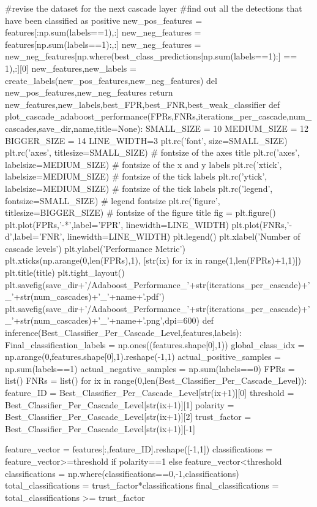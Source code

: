 \documentclass{article}
\begin{document}
\begin{python}
	#revise the dataset for the next cascade layer
	#find out all the detections that have been classified as positive
	new_pos_features = features[:np.sum(labels==1),:]
	new_neg_features = features[np.sum(labels==1):,:]
	new_neg_features = new_neg_features[np.where(best_class_predictions[np.sum(labels==1):] == 1),:][0]
	new_features,new_labels = create_labels(new_pos_features,new_neg_features)
	del new_pos_features,new_neg_features
	return new_features,new_labels,best_FPR,best_FNR,best_weak_classifier
def plot_cascade_adaboost_performance(FPRs,FNRs,iterations_per_cascade,num_cascades,save_dir,name,title=None):
	SMALL_SIZE = 10
	MEDIUM_SIZE = 12
	BIGGER_SIZE = 14
	LINE_WIDTH=3
	plt.rc('font', size=SMALL_SIZE)
	plt.rc('axes', titlesize=SMALL_SIZE)     # fontsize of the axes title
	plt.rc('axes', labelsize=MEDIUM_SIZE)    # fontsize of the x and y labels
	plt.rc('xtick', labelsize=MEDIUM_SIZE)    # fontsize of the tick labels
	plt.rc('ytick', labelsize=MEDIUM_SIZE)    # fontsize of the tick labels
	plt.rc('legend', fontsize=SMALL_SIZE)    # legend fontsize
	plt.rc('figure', titlesize=BIGGER_SIZE)  # fontsize of the figure title
	fig = plt.figure()
	plt.plot(FPRs,'-*',label='FPR', linewidth=LINE_WIDTH)
	plt.plot(FNRs,'-d',label='FNR', linewidth=LINE_WIDTH)
	plt.legend()
	plt.xlabel('Number of cascade levels')
	plt.ylabel('Performance Metric')
	plt.xticks(np.arange(0,len(FPRs),1), [str(ix) for ix in range(1,len(FPRs)+1,1)])
	plt.title(title)
	plt.tight_layout()
	plt.savefig(save_dir+'/Adaboost_Performance_'+str(iterations_per_cascade)+'_'+str(num_cascades)+'_'+name+'.pdf')
	plt.savefig(save_dir+'/Adaboost_Performance_'+str(iterations_per_cascade)+'_'+str(num_cascades)+'_'+name+'.png',dpi=600)
def inference(Best_Classifier_Per_Cascade_Level,features,labels):
	Final_classification_labels = np.ones((features.shape[0],1))
	global_class_idx = np.arange(0,features.shape[0],1).reshape(-1,1)
	actual_positive_samples = np.sum(labels==1)
	actual_negative_samples = np.sum(labels==0)
	FPRs = list()
	FNRs = list()
	for ix in range(0,len(Best_Classifier_Per_Cascade_Level)):
		feature_ID = Best_Classifier_Per_Cascade_Level[str(ix+1)][0]
		threshold = Best_Classifier_Per_Cascade_Level[str(ix+1)][1]
		polarity = Best_Classifier_Per_Cascade_Level[str(ix+1)][2]
		trust_factor = Best_Classifier_Per_Cascade_Level[str(ix+1)][-1]

		feature_vector = features[:,feature_ID].reshape([-1,1])
		classifications = feature_vector>=threshold if polarity==1 else feature_vector<threshold
		classifications = np.where(classifications==0,-1,classifications)
		total_classifications = trust_factor*classifications
		final_classifications = total_classifications >= trust_factor


\end{python}
\end{document}
